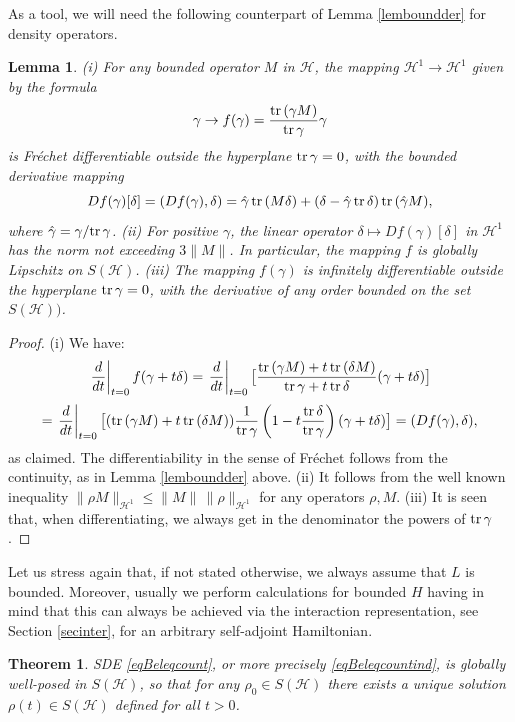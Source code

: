 \documentclass[12pt]{article}
\def\HC{\mathcal{H}}
\def\tr{\rm{tr}}
\def\de{\delta}
\def\ga{\gamma}
\newtheorem{theorem}{Theorem}[section]
\newtheorem{lemma}{Lemma}[section]
\begin{document}
As a tool, we will need the following counterpart of Lemma \ref{lemboundder} for density operators.

\begin{lemma}
 \label{lemboundderden}
 (i) For any bounded operator $M$ in $\HC$, the mapping
 $\HC^1 \to \HC^1$ given by the formula
 \[
 \ga \to f(\ga)= \frac{{\tr}\, (\ga M)}{{\tr}\, \ga} \ga
\]
is Fr\'echet differentiable outside the hyperplane ${\tr}\, \ga =0$,  with the bounded derivative mapping
\[
Df(\ga)[\de]=(Df(\ga), \de)
=\hat \ga \, {\tr}\, (M\de) +(\de-\hat \ga \,{\tr}\, \de) \,{\tr}\, (\hat \ga M),
 \]
 where $\hat \ga=\ga/{\tr} \, \ga$. (ii) For positive $\ga$, the linear operator $\de\mapsto Df(\ga)[\de]$
in $\HC^1$ has the norm not exceeding $3\|M\|$.
In particular, the mapping $f$ is globally Lipschitz on $S(\HC)$. (iii) The mapping $f(\ga)$ is infinitely differentiable
outside the hyperplane ${\tr}\, \ga =0$, with the derivative of any order bounded on the set $S(\HC))$.
\end{lemma}

\begin{proof}
(i) We have:
\[
\left.\frac{d}{dt}\right|_{t=0} f(\ga+t\de)
=\left.\frac{d}{dt}\right|_{t=0}
\bigl[\frac{{\tr}\, (\ga M)+t\, {\tr}\, (\de M)}{{\tr}\, \ga +t\, {\tr}\, \de}
 (\ga+t\de)\bigr]
\]
\[
=\left.\frac{d}{dt}\right|_{t=0}\bigl[ ({\tr}\, (\ga M)+t\, {\tr}\, (\de M))\frac{1}{{\tr}\, \ga}
\left(1-t \frac{{\tr}\, \de}{{\tr}\, \ga}\right)(\ga +t \de)\bigr]
=(Df(\ga),\de),
\]
as claimed. The differentiability in the sense of Fr\'echet follows from the continuity,
as in Lemma  \ref{lemboundder} above. (ii) It follows from the well known inequality
$\|\rho M\|_{\HC^1}\le \|M\| \, \|\rho\|_{\HC^1}$ for any operators $\rho, M$. (iii)
It is seen that, when differentiating, we always get in the denominator
the powers of ${\tr}\, \ga$.
\end{proof}

Let us stress again that, if not stated otherwise, we always assume that $L$ is bounded. Moreover,
usually we perform calculations for bounded $H$ having in mind that this can always be achieved
via the interaction representation, see Section \ref{secinter}, for an arbitrary self-adjoint Hamiltonian.

\begin{theorem}
\label{JumpWellSDE}
SDE \eqref{eqBeleqcount}, or more precisely \eqref{eqBeleqcountind},
is globally well-posed in $S(\HC)$, so that for any $\rho_0\in S(\HC)$ there exists
a unique solution $\rho(t)\in S(\HC)$ defined for all $t>0$.
\end{theorem}
\end{document}
